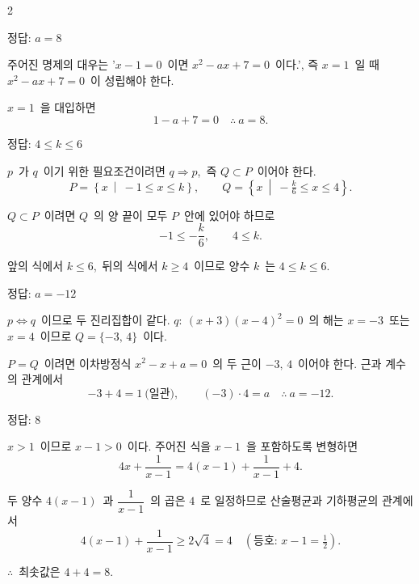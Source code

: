 \documentclass[10pt,fleqn]{article}
\begin{document}
\begin{multicols*}{2}
\begin{dmanswerbox}
정답: $a=8$
\end{dmanswerbox}

주어진 명제의 대우는 '$x-1=0$\ 이면 $x^{2}-ax+7=0$\ 이다.', 즉 $x=1$\ 일 때 $x^{2}-ax+7=0$\ 이 성립해야 한다.

$x=1$\ 을 대입하면
\[ 1-a+7=0\quad\therefore\ a=8. \]

\begin{dmanswerbox}
정답: $4\le k\le 6$
\end{dmanswerbox}

$p$\ 가 $q$\ 이기 위한 필요조건이려면 $q\Rightarrow p$,\ 즉 $Q\subset P$\ 이어야 한다.
\[ P=\left\{x\ \middle|\ -1\le x\le k\right\},\qquad Q=\left\{x\ \middle|\ -\tfrac{k}{6}\le x\le 4\right\}. \]

$Q\subset P$\ 이려면 $Q$\ 의 양 끝이 모두 $P$\ 안에 있어야 하므로
\[ -1\le -\dfrac{k}{6},\qquad 4\le k. \]

앞의 식에서 $k\le 6$,\ 뒤의 식에서 $k\ge 4$\ 이므로 양수 $k$\ 는 $4\le k\le 6$.

\begin{dmanswerbox}
정답: $a=-12$
\end{dmanswerbox}

$p\Leftrightarrow q$\ 이므로 두 진리집합이 같다. $q:\ (x+3)(x-4)^{2}=0$\ 의 해는 $x=-3$\ 또는 $x=4$\ 이므로 $Q=\{-3,\,4\}$\ 이다.

$P=Q$\ 이려면 이차방정식 $x^{2}-x+a=0$\ 의 두 근이 $-3,\,4$\ 이어야 한다. 근과 계수의 관계에서
\[ -3+4=1\ \text{(일관)},\qquad (-3)\cdot 4=a\quad\therefore\ a=-12. \]

\begin{dmanswerbox}
정답: $8$
\end{dmanswerbox}

$x>1$\ 이므로 $x-1>0$\ 이다. 주어진 식을 $x-1$\ 을 포함하도록 변형하면
\[ 4x+\dfrac{1}{x-1}=4(x-1)+\dfrac{1}{x-1}+4. \]

두 양수 $4(x-1)$\ 과 $\dfrac{1}{x-1}$\ 의 곱은 $4$\ 로 일정하므로 산술평균과 기하평균의 관계에서
\[ 4(x-1)+\dfrac{1}{x-1}\ge 2\sqrt{4}=4\quad(\text{등호: } x-1=\tfrac{1}{2}). \]

$\therefore$\ 최솟값은 $4+4=8$.


\end{multicols*}
\end{document}
